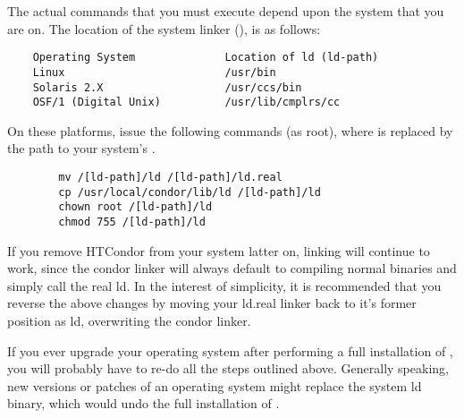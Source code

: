 The actual commands that you must execute depend upon the system that you
are on.  The location of the system linker (), is as follows:
\begin{verbatim}
	Operating System              Location of ld (ld-path)
	Linux                         /usr/bin
	Solaris 2.X                   /usr/ccs/bin
	OSF/1 (Digital Unix)          /usr/lib/cmplrs/cc
\end{verbatim}

On these platforms, issue the following commands (as root), where
 is replaced by the path to your system's .
\begin{verbatim}
        mv /[ld-path]/ld /[ld-path]/ld.real
        cp /usr/local/condor/lib/ld /[ld-path]/ld
        chown root /[ld-path]/ld
        chmod 755 /[ld-path]/ld
\end{verbatim}

If you remove HTCondor from your system latter on, linking will continue
to work, since the condor linker will always default to compiling
normal binaries and simply call the real ld.  In the interest of
simplicity, it is recommended that you reverse the above changes by
moving your ld.real linker back to it's former position as ld,
overwriting the condor linker.

\Note If you ever upgrade your operating system after performing a
full installation of , you will probably have to re-do
all the steps outlined above.
Generally speaking, new versions or patches of an operating system
might replace the system ld binary, which would undo the
full installation of .

